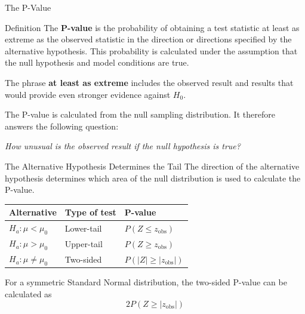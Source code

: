 \documentclass[aspectratio=169]{beamer}
\begin{document}
\begin{frame}{The P-Value}
\begin{block}{Definition}
The \textbf{P-value} is the probability of obtaining a test statistic at least as extreme as the observed statistic in the direction or directions specified by the alternative hypothesis. This probability is calculated under the assumption that the null hypothesis and model conditions are true.
\end{block}

\vspace{0.2cm}
The phrase \textbf{at least as extreme} includes the observed result and results that would provide even stronger evidence against $H_0$.

\vspace{0.2cm}
The P-value is calculated from the null sampling distribution. It therefore answers the following question:
\begin{center}
\textit{How unusual is the observed result if the null hypothesis is true?}
\end{center}
\end{frame}

\begin{frame}{The Alternative Hypothesis Determines the Tail}
The direction of the alternative hypothesis determines which area of the null distribution is used to calculate the P-value.

\vspace{0.2cm}
\begin{center}
\begin{tabular}{lll}
\toprule
\textbf{Alternative} & \textbf{Type of test} & \textbf{P-value} \\
\midrule
$H_a:\mu<\mu_0$
& Lower-tail
& $P(Z\leq z_{\mathrm{obs}})$ \\[1mm]

$H_a:\mu>\mu_0$
& Upper-tail
& $P(Z\geq z_{\mathrm{obs}})$ \\[1mm]

$H_a:\mu\ne\mu_0$
& Two-sided
& $P(|Z|\geq|z_{\mathrm{obs}}|)$ \\
\bottomrule
\end{tabular}
\end{center}

\vspace{0.2cm}
For a symmetric Standard Normal distribution, the two-sided P-value can be calculated as
$$2P(Z\geq|z_{\mathrm{obs}}|)$$
\end{frame}
\end{document}
